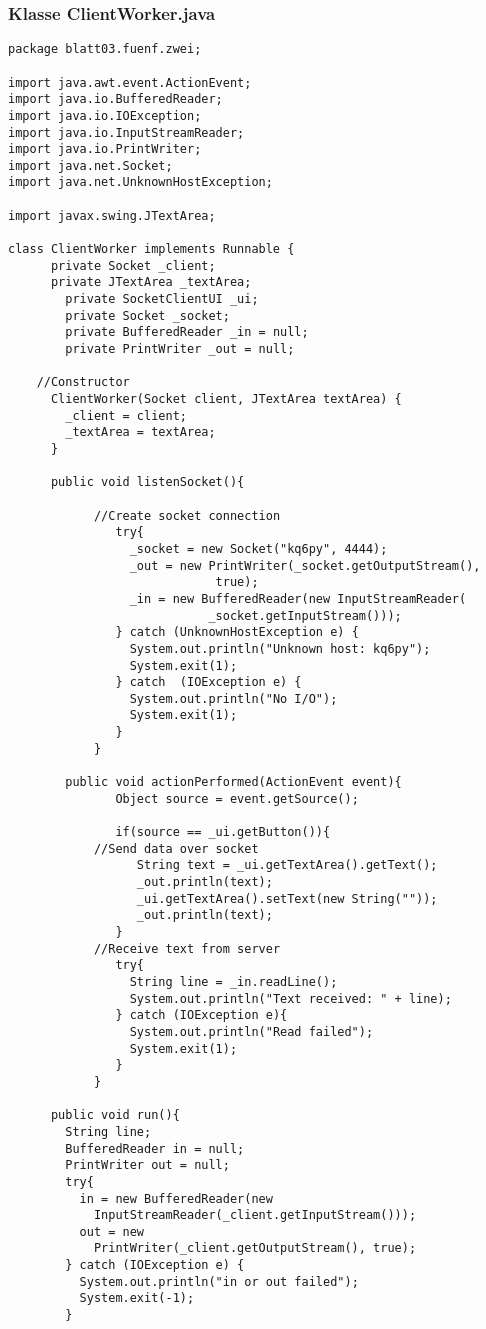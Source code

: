 \documentclass[twoside]{article}
\begin{document}
\subsubsection*{Klasse ClientWorker.java}
\begin{lstlisting}
package blatt03.fuenf.zwei;

import java.awt.event.ActionEvent;
import java.io.BufferedReader;
import java.io.IOException;
import java.io.InputStreamReader;
import java.io.PrintWriter;
import java.net.Socket;
import java.net.UnknownHostException;

import javax.swing.JTextArea;

class ClientWorker implements Runnable {
	  private Socket _client;
	  private JTextArea _textArea;
		private SocketClientUI _ui;
		private Socket _socket;
		private BufferedReader _in = null;
		private PrintWriter _out = null;

	//Constructor
	  ClientWorker(Socket client, JTextArea textArea) {
	    _client = client;
	    _textArea = textArea;
	  }
	  
	  public void listenSocket(){
			
			//Create socket connection
			   try{
			     _socket = new Socket("kq6py", 4444);
			     _out = new PrintWriter(_socket.getOutputStream(), 
			                 true);
			     _in = new BufferedReader(new InputStreamReader(
			                _socket.getInputStream()));
			   } catch (UnknownHostException e) {
			     System.out.println("Unknown host: kq6py");
			     System.exit(1);
			   } catch  (IOException e) {
			     System.out.println("No I/O");
			     System.exit(1);
			   }
			}
		
		public void actionPerformed(ActionEvent event){
			   Object source = event.getSource();

			   if(source == _ui.getButton()){
			//Send data over socket
			      String text = _ui.getTextArea().getText();
			      _out.println(text);
			      _ui.getTextArea().setText(new String(""));
			      _out.println(text);
			   }
			//Receive text from server
			   try{
			     String line = _in.readLine();
			     System.out.println("Text received: " + line);
			   } catch (IOException e){
			     System.out.println("Read failed");
			     System.exit(1);
			   }
			} 

	  public void run(){
	    String line;
	    BufferedReader in = null;
	    PrintWriter out = null;
	    try{
	      in = new BufferedReader(new 
	        InputStreamReader(_client.getInputStream()));
	      out = new 
	        PrintWriter(_client.getOutputStream(), true);
	    } catch (IOException e) {
	      System.out.println("in or out failed");
	      System.exit(-1);
	    }


\end{lstlisting}
\end{document}
